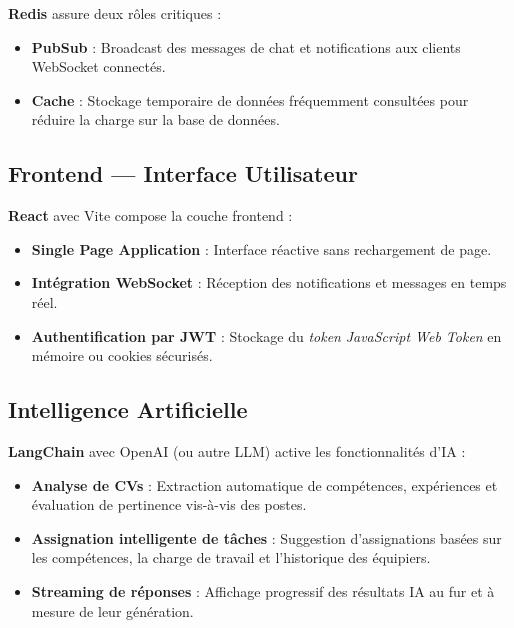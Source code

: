 \textbf{\Gls{Redis}} assure deux rôles critiques :

\begin{itemize}
    \item \textbf{\gls{PubSub}} : Broadcast des messages de chat et notifications aux clients WebSocket connectés.

    \item \textbf{Cache} : Stockage temporaire de données fréquemment consultées pour réduire la charge sur la base de données.
\end{itemize}

\subsection{Frontend — Interface Utilisateur}

\textbf{\Gls{React}} avec \Gls{Vite} compose la couche frontend :

\begin{itemize}
    \item \textbf{Single Page Application} : Interface réactive sans rechargement de page.

    \item \textbf{Intégration WebSocket} : Réception des notifications et messages en temps réel.

    \item \textbf{Authentification par JWT} : Stockage du \textit{token} \textit{JavaScript Web Token} en mémoire ou cookies sécurisés.
\end{itemize}

\subsection{Intelligence Artificielle}

\textbf{\Gls{LangChain}} avec \gls{OpenAI} (ou autre \gls{LLM}) active les fonctionnalités d'\gls{IA} :

\begin{itemize}
    \item \textbf{Analyse de \glspl{CV}} : Extraction automatique de compétences, expériences et évaluation de pertinence vis-à-vis des postes.

    \item \textbf{Assignation intelligente de tâches} : Suggestion d'assignations basées sur les compétences, la charge de travail et l'historique des équipiers.

    \item \textbf{Streaming de réponses} : Affichage progressif des résultats \gls{IA} au fur et à mesure de leur génération.
\end{itemize}

